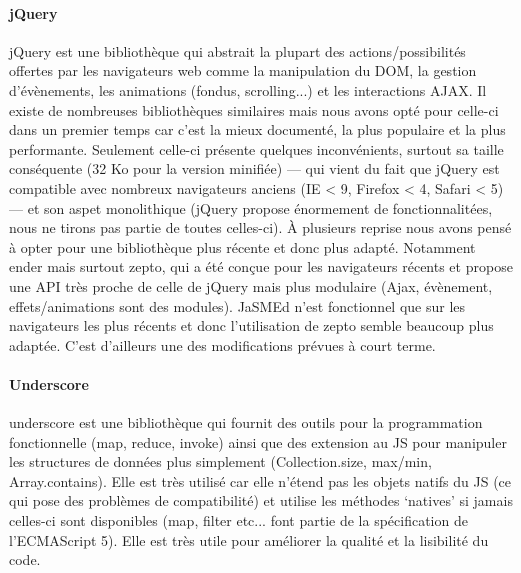 \documentclass[pdftex,12pt,a4paper]{article}
\begin{document}
\paragraph{jQuery}
jQuery est une bibliothèque qui abstrait la plupart des actions/possibilités offertes par les navigateurs web comme la manipulation du DOM, la gestion d’évènements, les animations (fondus, scrolling...) et les interactions AJAX.
Il existe de nombreuses bibliothèques similaires mais nous avons opté pour celle-ci dans un premier temps car c’est la mieux documenté, la plus populaire et la plus performante. Seulement celle-ci présente quelques inconvénients, surtout sa taille conséquente (32 Ko pour la version minifiée) — qui vient du fait que jQuery est compatible avec nombreux navigateurs anciens (IE < 9, Firefox < 4, Safari < 5) — et son aspet monolithique (jQuery propose énormement de fonctionnalitées, nous ne tirons pas partie de toutes celles-ci).
À plusieurs reprise nous avons pensé à opter pour une bibliothèque plus récente et donc plus adapté. Notamment ender mais surtout zepto, qui a été conçue pour les navigateurs récents et propose une API très proche de celle de jQuery mais plus modulaire (Ajax, évènement, effets/animations sont des modules).
JaSMEd n’est fonctionnel que sur les navigateurs les plus récents et donc l’utilisation de zepto semble beaucoup plus adaptée. C’est d'ailleurs une des modifications prévues à court terme.

\paragraph{Underscore}
underscore est une bibliothèque qui fournit des outils pour la programmation fonctionnelle (map, reduce, invoke) ainsi que des extension au JS pour manipuler les structures de données plus simplement (Collection.size, max/min, Array.contains). Elle est très utilisé car elle n’étend pas les objets natifs du JS (ce qui pose des problèmes de compatibilité) et utilise les méthodes ‘natives’ si jamais celles-ci sont disponibles (map, filter etc... font partie de la spécification de l’ECMAScript 5). Elle est très utile pour améliorer la qualité et la lisibilité du code.
\end{document}

